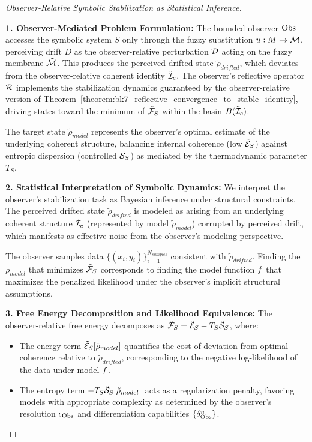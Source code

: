\begin{proof}[Observer-Relative Symbolic Stabilization as Statistical Inference]
\label{proof:bk7_observer_relative_symbolic_stabilization_as_statistical_inference}

\textbf{1. Observer-Mediated Problem Formulation:} The bounded observer $\mathrm{Obs}$ accesses the symbolic system $S$ only through the fuzzy substitution $u: M \to \tilde{\mathcal{M}}$, perceiving drift $D$ as the observer-relative perturbation $\tilde{\mathcal{D}}$ acting on the fuzzy membrane $\tilde{\mathcal{M}}$. This produces the perceived drifted state $\tilde{\rho}_{drifted}$, which deviates from the observer-relative coherent identity $\tilde{\mathcal{I}}_c$. The observer's reflective operator $\tilde{\mathcal{R}}$ implements the stabilization dynamics guaranteed by the observer-relative version of Theorem~\ref{theorem:bk7_reflective_convergence_to_stable_identity}, driving states toward the minimum of $\tilde{\mathcal{F}}_S$ within the basin $B(\tilde{\mathcal{I}}_c)$.

The target state $\tilde{\rho}_{model}$ represents the observer's optimal estimate of the underlying coherent structure, balancing internal coherence (low $\tilde{\mathcal{E}}_S$) against entropic dispersion (controlled $\tilde{\mathcal{S}}_S$) as mediated by the thermodynamic parameter $T_S$.

\textbf{2. Statistical Interpretation of Symbolic Dynamics:} We interpret the observer's stabilization task as Bayesian inference under structural constraints. The perceived drifted state $\tilde{\rho}_{drifted}$ is modeled as arising from an underlying coherent structure $\tilde{\mathcal{I}}_c$ (represented by model $\tilde{\rho}_{model}$) corrupted by perceived drift, which manifests as effective noise from the observer's modeling perspective.

The observer samples data $\{(x_i, y_i)\}_{i=1}^{N_{samples}}$ consistent with $\tilde{\rho}_{drifted}$. Finding the $\tilde{\rho}_{model}$ that minimizes $\tilde{\mathcal{F}}_S$ corresponds to finding the model function $f$ that maximizes the penalized likelihood under the observer's implicit structural assumptions.

\textbf{3. Free Energy Decomposition and Likelihood Equivalence:} The observer-relative free energy decomposes as $\tilde{\mathcal{F}}_S = \tilde{\mathcal{E}}_S - T_S \tilde{\mathcal{S}}_S$, where:
\begin{itemize}
    \item The energy term $\tilde{\mathcal{E}}_S[\tilde{\rho}_{model}]$ quantifies the cost of deviation from optimal coherence relative to $\tilde{\rho}_{drifted}$, corresponding to the negative log-likelihood of the data under model $f$.
    \item The entropy term $-T_S \tilde{\mathcal{S}}_S[\tilde{\rho}_{model}]$ acts as a regularization penalty, favoring models with appropriate complexity as determined by the observer's resolution $\epsilon_{\mathrm{Obs}}$ and differentiation capabilities $\{\delta^n_{\mathrm{Obs}}\}$.
\end{itemize}


\end{proof}
